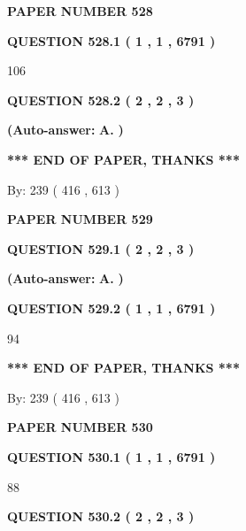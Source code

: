 \documentclass{ctexart}
\begin{document}
   
\newpage 
\setcounter{page}{ 
   528001 } 
   
   
 {\textbf{ \Large{ PAPER NUMBER  528  }}}
   
   
   
   
  
  
{\textbf{\large{QUESTION
528.1 
 ( 1 , 1 , 6791 )
}}}

106
  
  
{\textbf{\large{QUESTION
528.2 
 ( 2 , 2 , 3 )
}}}
 
 
{\textbf{(Auto-answer:}}
{\textbf{\large{
A.}}}
{\textbf{)}}
 
 
   
   
   
   
\vspace{1.0in} 
{\textbf{\large{ *** END OF PAPER, THANKS *** }}} 
   
   
\hspace{1.0in} By: 
 239 ( 416 ,  613 )
   
   
   
   
\newpage 
\setcounter{page}{ 
   529001 } 
   
   
 {\textbf{ \Large{ PAPER NUMBER  529  }}}
   
   
   
   
  
  
{\textbf{\large{QUESTION
529.1 
 ( 2 , 2 , 3 )
}}}
 
 
{\textbf{(Auto-answer:}}
{\textbf{\large{
A.}}}
{\textbf{)}}
 
 
  
  
{\textbf{\large{QUESTION
529.2 
 ( 1 , 1 , 6791 )
}}}

94
   
   
   
   
\vspace{1.0in} 
{\textbf{\large{ *** END OF PAPER, THANKS *** }}} 
   
   
\hspace{1.0in} By: 
 239 ( 416 ,  613 )
   
   
   
   
\newpage 
\setcounter{page}{ 
   530001 } 
   
   
 {\textbf{ \Large{ PAPER NUMBER  530  }}}
   
   
   
   
  
  
{\textbf{\large{QUESTION
530.1 
 ( 1 , 1 , 6791 )
}}}

88
  
  
{\textbf{\large{QUESTION
530.2 
 ( 2 , 2 , 3 )
}}}
 
\end{document}
